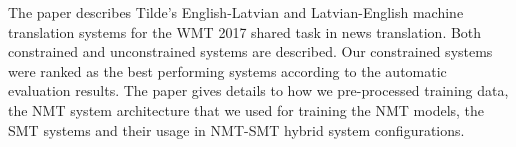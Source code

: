 The paper describes Tilde's English-Latvian and Latvian-English machine translation systems for the WMT 2017 shared task in news translation. Both constrained and unconstrained systems are described. Our constrained systems were ranked as the best performing systems according to the automatic evaluation results. The paper gives details to how we pre-processed training data, the NMT system architecture that we used for training the NMT models, the SMT systems and their usage in NMT-SMT hybrid system configurations.
